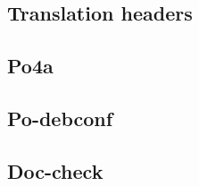 \documentclass{beamer}
\begin{document}
\begin{frame}
  \frametitle{}
\end{frame}

\subsection{Translation headers}

\begin{frame}
  \frametitle{}
\end{frame}

\begin{frame}
  \frametitle{}
\end{frame}

\begin{frame}
  \frametitle{}
\end{frame}

\subsection{Po4a}

\begin{frame}
  \frametitle{}
\end{frame}

\begin{frame}
  \frametitle{}
\end{frame}

\begin{frame}
  \frametitle{}
\end{frame}

\subsection{Po-debconf}

\begin{frame}
  \frametitle{}
\end{frame}

\begin{frame}
  \frametitle{}
\end{frame}

\begin{frame}
  \frametitle{}
\end{frame}

\subsection{Doc-check}
\end{document}
